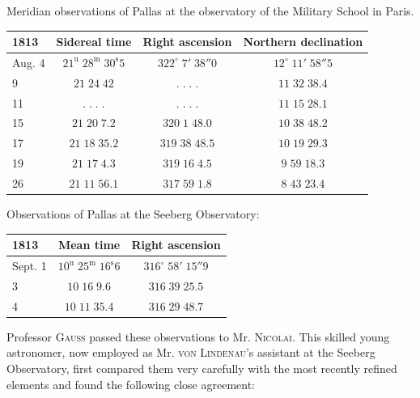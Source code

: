 \begin{center}Meridian observations of Pallas at the observatory of the Military School in Paris.\end{center}
\begin{center}\fontsize{10}{12}\selectfont\setlength{\tabcolsep}{5pt}\renewcommand{\arraystretch}{1.15}\begin{tabular}{l|c|c|c}
1813 & Sidereal time & Right ascension & Northern declination\\\hline
Aug. 4 & $21^{\mathrm u}\;28^{\mathrm m}\;30^{\mathrm s}5$ & $322^\circ\;7'\;38''0$ & $12^\circ\;11'\;58''5$\\
9 & $21\;24\;42$ & $.\;.\;.\;.$ & $11\;32\;38.4$\\
11 & $.\;.\;.\;.$ & $.\;.\;.\;.$ & $11\;15\;28.1$\\
15 & $21\;20\;7.2$ & $320\;1\;48.0$ & $10\;38\;48.2$\\
17 & $21\;18\;35.2$ & $319\;38\;48.5$ & $10\;19\;29.3$\\
19 & $21\;17\;4.3$ & $319\;16\;4.5$ & $9\;59\;18.3$\\
26 & $21\;11\;56.1$ & $317\;59\;1.8$ & $8\;43\;23.4$\\
\end{tabular}\end{center}

\begin{center}\leavevmode{}Observations of Pallas at the Seeberg Observatory:\end{center}

\begin{center}\fontsize{10}{12}\selectfont\setlength{\tabcolsep}{5pt}\renewcommand{\arraystretch}{1.15}\begin{tabular}{l|c|c}
1813 & Mean time & Right ascension\\\hline
Sept. 1 & $10^{\mathrm u}\;25^{\mathrm m}\;16^{\mathrm s}6$ & $316^\circ\;58'\;15''9$\\
3 & $10\;16\;9.6$ & $316\;39\;25.5$\\
4 & $10\;11\;35.4$ & $316\;29\;48.7$\\
\end{tabular}\end{center}

\par\indent Professor \textsc{Gauss} passed these observations to Mr. \textsc{Nicolai}. This skilled young astronomer, now employed as Mr. \textsc{von Lindenau}’s assistant at the Seeberg Observatory, first compared them very carefully with the most recently refined elements and found the following close agreement:

